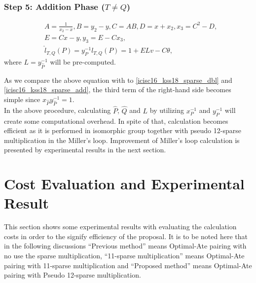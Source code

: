 \subsubsection{Step 5: Addition Phase \texorpdfstring{($T\neq Q$)}{}}
\begin{eqnarray}
&A=\frac{1}{x_2-x}, B=y_2-y, C=AB, D=x+x_2, x_3=C^2-D,\nonumber\\
&E=Cx-y, y_3=E-Cx_3,\nonumber\\
&\hat{l}_{T,Q}(P) = y^{-1}_Pl_{T,Q}(P)=1+ELv-C\theta,\label{pseudo_add}
\end{eqnarray}
where $L=y_{\hat{P}}^{-1}$ will be pre-computed.

As we compare the above equation with to \eqref{icisc16_kss18_sparse_dbl} and \eqref{icisc16_kss18_sparse_add}, the third term of the right-hand side becomes simple since $x_{\hat{P}}y_{\hat{P}}^{-1}=1$.\\
In the above procedure, calculating $\hat{P}$, $\hat{Q}$ and $L$ by utilizing $x_P^{-1}$ and $y_P^{-1}$ will create some computational overhead. In spite of that, calculation becomes efficient as it is performed in isomorphic group together with pseudo 12-sparse multiplication in the Miller's loop. Improvement of Miller's loop calculation is presented by experimental results in the next section. 


\section{Cost Evaluation and Experimental Result}
This section shows some experimental results with evaluating the calculation costs in order to the signify efficiency of the proposal.
It is to be noted here that in the following discussions ``Previous method'' means Optimal-Ate pairing with no use the sparse multiplication, ``11-sparse multiplication'' means Optimal-Ate pairing with 11-sparse multiplication and ``Proposed method'' means Optimal-Ate pairing with Pseudo 12-sparse multiplication.
